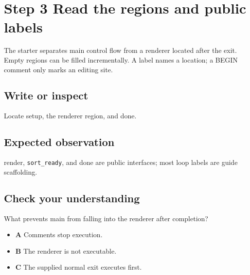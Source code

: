 \section{Step 3 Read the regions and public
  labels}\label{009-sorting-visualizer-s03-step-3-read-the-regions-and-public-labels}

The starter separates main control flow from a renderer located after
the exit. Empty regions can be filled incrementally. A label names a
location; a BEGIN comment only marks an editing site.

\subsection{Write or
  inspect}\label{009-sorting-visualizer-s03-write-or-inspect}

Locate setup, the renderer region, and done.

\subsection{Expected
  observation}\label{009-sorting-visualizer-s03-expected-observation}

render, \texttt{sort\_ready}, and done are public interfaces; most loop
labels are guide scaffolding.

\subsection{Check your
  understanding}\label{009-sorting-visualizer-s03-check-your-understanding}

What prevents main from falling into the renderer after completion?

\begin{itemize}
  \tightlist
  \item
        \textbf{A} Comments stop execution.
  \item
        \textbf{B} The renderer is not executable.
  \item
        \textbf{C} The supplied normal exit executes first.
\end{itemize}
